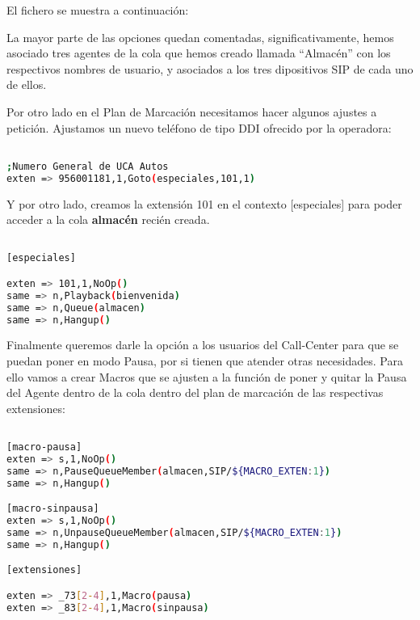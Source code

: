 El fichero se muestra a continuación:



La mayor parte de las opciones quedan comentadas, significativamente, hemos asociado tres agentes de la cola que hemos creado llamada ``Almacén'' con los respectivos nombres de usuario, y asociados a los tres dipositivos SIP de cada uno de ellos.

Por otro lado en el Plan de Marcación necesitamos hacer algunos ajustes a petición. Ajustamos un nuevo teléfono de tipo DDI ofrecido por la operadora:

\begin{lstlisting}[language=bash,title={/etc/asterisk/extensions.conf}]

;Numero General de UCA Autos
exten => 956001181,1,Goto(especiales,101,1)

\end{lstlisting}

Y por otro lado, creamos la extensión 101 en el contexto [especiales] para poder acceder a la cola \textbf{almacén} recién creada.

\begin{lstlisting}[language=bash,title={/etc/asterisk/extensions.conf}]

[especiales]

exten => 101,1,NoOp()
same => n,Playback(bienvenida)
same => n,Queue(almacen)
same => n,Hangup()

\end{lstlisting}

Finalmente queremos darle la opción a los usuarios del Call-Center para que se puedan poner en modo Pausa, por si tienen que atender otras necesidades.
Para ello vamos a crear Macros que se ajusten a la función de poner y quitar la Pausa del Agente dentro de la cola dentro del plan de marcación de las respectivas extensiones:

\begin{lstlisting}[language=bash,title={/etc/asterisk/extensions.conf}]

[macro-pausa]
exten => s,1,NoOp()
same => n,PauseQueueMember(almacen,SIP/${MACRO_EXTEN:1})
same => n,Hangup()

[macro-sinpausa]
exten => s,1,NoOp()
same => n,UnpauseQueueMember(almacen,SIP/${MACRO_EXTEN:1})
same => n,Hangup()

[extensiones]

exten => _73[2-4],1,Macro(pausa)
exten => _83[2-4],1,Macro(sinpausa)

\end{lstlisting}

